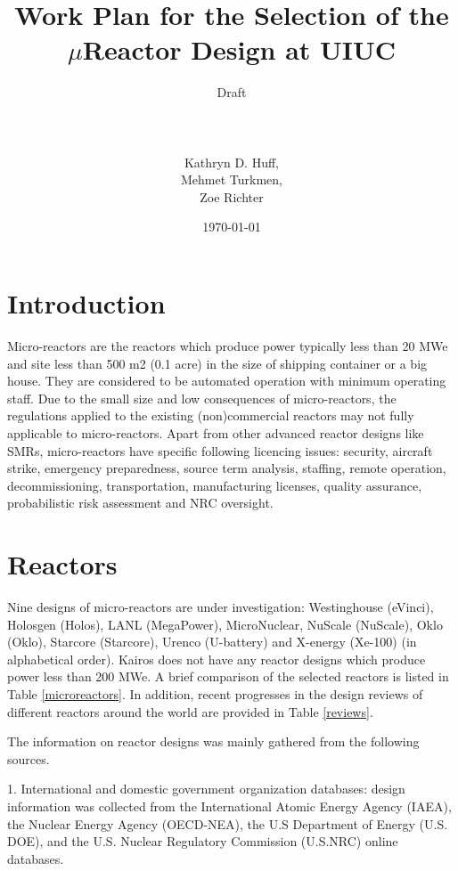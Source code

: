 \documentclass[10pt,a4paper]{article}
\begin{document}
\title{Work Plan for the Selection of the $\mu$Reactor Design at UIUC\\}
\author{Draft\\ \\ \\ \\ Kathryn D. Huff,\\
Mehmet Turkmen,\\
Zoe Richter}
\date{\today}
\maketitle

\pagebreak
\section{Introduction}
Micro-reactors are the reactors which produce power typically less than 20 MWe and site less than 500 m2 (0.1 acre) in the size of shipping container or a big house. They are considered to be automated operation with minimum operating staff. Due to the small size and low consequences of micro-reactors, the regulations applied to the existing (non)commercial reactors may not fully applicable to micro-reactors. Apart from other advanced reactor designs like SMRs, micro-reactors have specific following licencing issues: security, aircraft strike, emergency preparedness, source term analysis, staffing, remote operation, decommissioning, transportation, manufacturing licenses, quality assurance, probabilistic risk assessment and NRC oversight.

\section{Reactors} \label{sec:reactors}
Nine designs of micro-reactors are under investigation: Westinghouse (eVinci), Holosgen (Holos), LANL (MegaPower), MicroNuclear, NuScale (NuScale), Oklo (Oklo), Starcore (Starcore), Urenco (U-battery) and X-energy (Xe-100) (in alphabetical order). Kairos does not have any reactor designs which produce power less than 200 MWe. A brief comparison of the selected reactors is listed in Table \ref{microreactors}. In addition, recent progresses in the design reviews of different reactors around the world are provided in Table \ref{reviews}. 

The information on reactor designs was mainly gathered from the following sources.

1. International and domestic government organization databases: design information was collected from the International Atomic Energy Agency (IAEA), the Nuclear Energy Agency (OECD-NEA), the U.S Department of Energy (U.S. DOE), and the U.S.
Nuclear Regulatory Commission (U.S.NRC) online databases.
\end{document}
